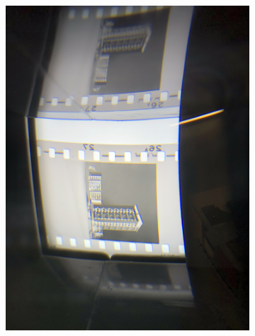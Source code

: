 \begin{figure}[H]
\begin{subfigure}{0.24\textwidth}
        \includegraphics[width=\linewidth]{Illustrations/P7.jpg}
        \caption{}
    \end{subfigure}
    \begin{subfigure}{0.24\textwidth}

\end{subfigure}
\end{figure}
